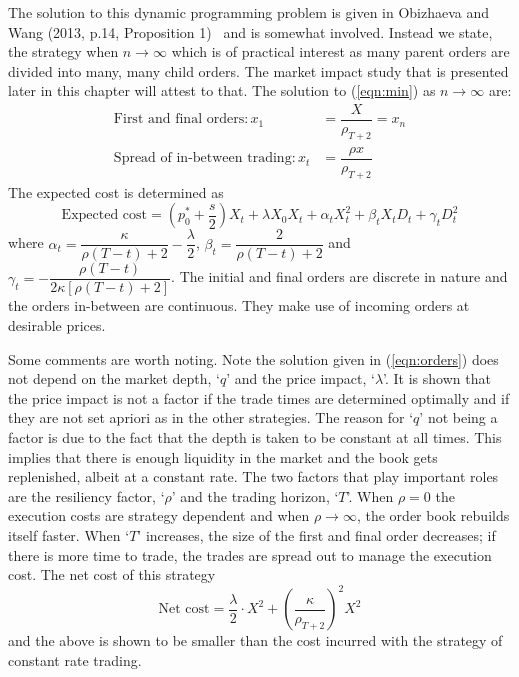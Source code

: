 The solution to this dynamic programming problem is given in Obizhaeva and Wang (2013, p.14, Proposition 1)~\cite{obizhaeva} and is somewhat involved. Instead we state, the strategy when $n\to\infty$ which is of practical interest as many parent orders are divided into many, many child orders. The market impact study that is presented later in this chapter will attest to that. The solution to (\ref{eqn:min}) as $n\to \infty$ are:
	\begin{equation}\label{eqn:orders}
	\begin{split}
	\text{First and final orders}: x_1&= \dfrac{X}{\rho_{T+2}} = x_n  \\
	\text{Spread of in-between trading}: x_t&= \dfrac{\rho x}{\rho_{T+2}}
	\end{split}
	\end{equation}
The expected cost is determined as
	\begin{equation}\label{eqn:expected}
	\text{Expected cost}=\left(p_0^*+\dfrac{s}{2}\right)X_t+\lambda X_0X_t+\alpha_t X_t^2+\beta_t X_t D_t+\gamma_t D_t^2
	\end{equation}
where $\alpha_t=\dfrac{\kappa}{\rho(T-t)+2} - \dfrac{\lambda}{2}$, $\beta_t=\dfrac{2}{\rho(T-t)+2}$ and $\gamma_t= - \dfrac{\rho(T-t)}{2\kappa[\rho(T-t)+2]}$. The initial and final orders are discrete in nature and the orders in-between are continuous. They make use of incoming orders at desirable prices. 


Some comments are worth noting. Note the solution given in (\ref{eqn:orders}) does not depend on the market depth, `$q$' and the price impact, `$\lambda$'. It is shown that the price impact is not a factor if the trade times are determined optimally and if they are not set apriori as in the other strategies. The reason for `$q$' not being a factor is due to the fact that the depth is taken to be constant at all times. This implies that there is enough liquidity in the market and the book gets replenished, albeit at a constant rate. The two factors that play important roles are the resiliency factor, `$\rho$' and the trading horizon, `$T$'. When $\rho=0$ the execution costs are strategy dependent and when $\rho\to\infty$, the order book rebuilds itself faster. When `$T$' increases, the size of the first and final order decreases; if there is more time to trade, the trades are spread out to manage the execution cost. The net cost of this strategy
	\begin{equation}\label{eqn:netcost}
	\text{Net cost}=\dfrac{\lambda}{2} \cdot X^2 + \left(\dfrac{\kappa}{\rho_{T+2}}\right)^2 X^2
	\end{equation}
and the above is shown to be smaller than the cost incurred with the strategy of constant rate trading. 


